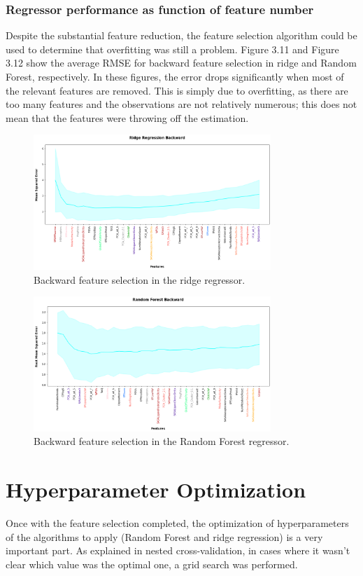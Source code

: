 \subsubsection{Regressor performance as function of feature number}
Despite the substantial feature reduction, the feature selection algorithm could be used to determine that overfitting was still a problem. Figure 3.11 and Figure 3.12 show the average RMSE for backward feature selection in ridge and Random Forest, respectively.
In these figures, the error drops significantly when most of the relevant features are removed. This is simply due to overfitting, as there are too many features and the observations are not relatively numerous; this does not mean that the features were throwing off the estimation.
\begin{figure}[h!]
    \centering
    \includegraphics[width=0.8\textwidth]{Images/Results/Ridge Backward.png}
    \caption{Backward feature selection in the ridge regressor.}
\end{figure}
\begin{figure}[h!]
    \centering
    \includegraphics[width=0.8\textwidth]{Images/Results/RF Backward.png}
    \caption{Backward feature selection in the Random Forest regressor.}
\end{figure}

\section{Hyperparameter Optimization}
Once with the feature selection completed, the optimization of hyperparameters of the algorithms to apply (Random Forest and ridge regression) is a very important part. As explained in nested cross-validation, in cases where it wasn't clear which value was the optimal one, a grid search was performed.\\

